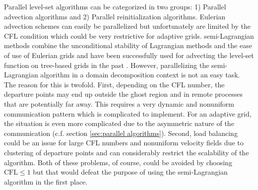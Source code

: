 Parallel level-set algorithms can be categorized in two groups: 1) Parallel advection algorithms and 2) Parallel reinitialization algorithms. Eulerian advection schemes can easily be parallelized but unfortunately are limited by the CFL condition which could be very restrictive for adaptive grids. semi-Lagrangian methods combine the unconditional stability of Lagrangian methods and the ease of use of Eulerian grids and have been successfully used for advecting the level-set function on tree-based grids in the past \cite{Min;Gibou:07:A-second-order-accur}. However, parallelizing the semi-Lagrangian algorithm in a domain decomposition context is not an easy task. The reason for this is twofold. First, depending on the CFL number, the departure points may end up outside the ghost region and in remote processes that are potentially far away. This requires a very dynamic and nonuniform communication pattern which is complicated to implement. For an adaptive grid, the situation is even more complicated due to the asymmetric nature of the communication (c.f. section \ref{sec:parallel algorithms}). Second, load balancing could be an issue for large CFL numbers and nonuniform velocity fields due to clustering of departure points and can considerably restrict the scalability of the algorithm. Both of these problems, of course, could be avoided by choosing $\text{CFL} \le 1$ but that would defeat the purpose of using the semi-Lagrangian algorithm in the first place. 

